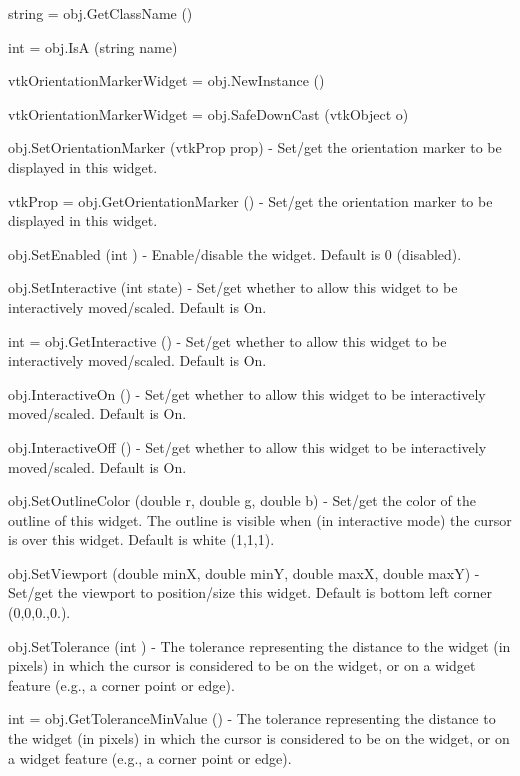 \begin{DoxyItemize}
\item {\ttfamily string = obj.\-Get\-Class\-Name ()}  
\item {\ttfamily int = obj.\-Is\-A (string name)}  
\item {\ttfamily vtk\-Orientation\-Marker\-Widget = obj.\-New\-Instance ()}  
\item {\ttfamily vtk\-Orientation\-Marker\-Widget = obj.\-Safe\-Down\-Cast (vtk\-Object o)}  
\item {\ttfamily obj.\-Set\-Orientation\-Marker (vtk\-Prop prop)} -\/ Set/get the orientation marker to be displayed in this widget.  
\item {\ttfamily vtk\-Prop = obj.\-Get\-Orientation\-Marker ()} -\/ Set/get the orientation marker to be displayed in this widget.  
\item {\ttfamily obj.\-Set\-Enabled (int )} -\/ Enable/disable the widget. Default is 0 (disabled).  
\item {\ttfamily obj.\-Set\-Interactive (int state)} -\/ Set/get whether to allow this widget to be interactively moved/scaled. Default is On.  
\item {\ttfamily int = obj.\-Get\-Interactive ()} -\/ Set/get whether to allow this widget to be interactively moved/scaled. Default is On.  
\item {\ttfamily obj.\-Interactive\-On ()} -\/ Set/get whether to allow this widget to be interactively moved/scaled. Default is On.  
\item {\ttfamily obj.\-Interactive\-Off ()} -\/ Set/get whether to allow this widget to be interactively moved/scaled. Default is On.  
\item {\ttfamily obj.\-Set\-Outline\-Color (double r, double g, double b)} -\/ Set/get the color of the outline of this widget. The outline is visible when (in interactive mode) the cursor is over this widget. Default is white (1,1,1).  
\item {\ttfamily obj.\-Set\-Viewport (double min\-X, double min\-Y, double max\-X, double max\-Y)} -\/ Set/get the viewport to position/size this widget. Default is bottom left corner (0,0,0.,0.).  
\item {\ttfamily obj.\-Set\-Tolerance (int )} -\/ The tolerance representing the distance to the widget (in pixels) in which the cursor is considered to be on the widget, or on a widget feature (e.\-g., a corner point or edge).  
\item {\ttfamily int = obj.\-Get\-Tolerance\-Min\-Value ()} -\/ The tolerance representing the distance to the widget (in pixels) in which the cursor is considered to be on the widget, or on a widget feature (e.\-g., a corner point or edge).  

\end{DoxyItemize}
